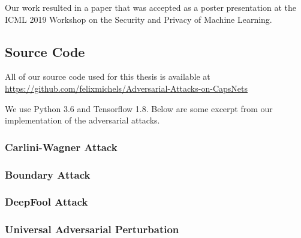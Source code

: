 Our work resulted in a paper \citep*{mine} that was accepted as a poster presentation at the ICML 2019 Workshop on the Security and Privacy of Machine Learning.



\subsection{Source Code}

All of our source code used for this thesis is available at \url{https://github.com/felixmichels/Adversarial-Attacks-on-CapsNets}

We use Python 3.6 and Tensorflow 1.8.
Below are some excerpt from our implementation of the adversarial attacks.

\subsubsection{Carlini-Wagner Attack}


\subsubsection{Boundary Attack}


\subsubsection{DeepFool Attack}


\subsubsection{Universal Adversarial Perturbation}

